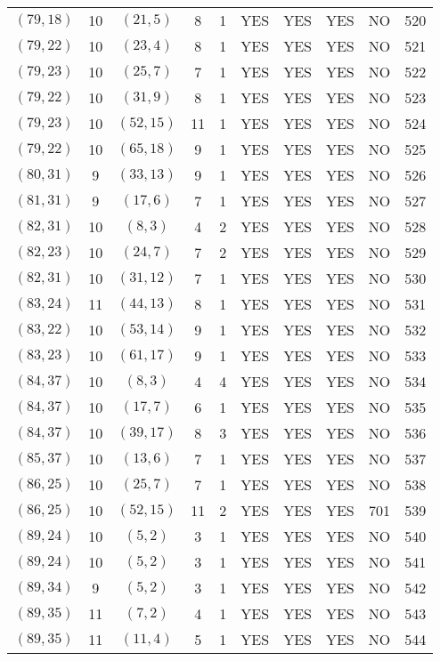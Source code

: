 \begin{longtable}{|c|c|c|c|c|c|c|c|c|c|}
$(79, 18)$ & 10 & $(21, 5)$ & 8 & 1 & YES & YES & YES & NO & 520\\
$(79, 22)$ & 10 & $(23, 4)$ & 8 & 1 & YES & YES & YES & NO & 521\\
$(79, 23)$ & 10 & $(25, 7)$ & 7 & 1 & YES & YES & YES & NO & 522\\
$(79, 22)$ & 10 & $(31, 9)$ & 8 & 1 & YES & YES & YES & NO & 523\\
$(79, 23)$ & 10 & $(52, 15)$ & 11 & 1 & YES & YES & YES & NO & 524\\
$(79, 22)$ & 10 & $(65, 18)$ & 9 & 1 & YES & YES & YES & NO & 525\\
$(80, 31)$ & 9 & $(33, 13)$ & 9 & 1 & YES & YES & YES & NO & 526\\
$(81, 31)$ & 9 & $(17, 6)$ & 7 & 1 & YES & YES & YES & NO & 527\\
$(82, 31)$ & 10 & $(8, 3)$ & 4 & 2 & YES & YES & YES & NO & 528\\
$(82, 23)$ & 10 & $(24, 7)$ & 7 & 2 & YES & YES & YES & NO & 529\\
$(82, 31)$ & 10 & $(31, 12)$ & 7 & 1 & YES & YES & YES & NO & 530\\
$(83, 24)$ & 11 & $(44, 13)$ & 8 & 1 & YES & YES & YES & NO & 531\\
$(83, 22)$ & 10 & $(53, 14)$ & 9 & 1 & YES & YES & YES & NO & 532\\
$(83, 23)$ & 10 & $(61, 17)$ & 9 & 1 & YES & YES & YES & NO & 533\\
$(84, 37)$ & 10 & $(8, 3)$ & 4 & 4 & YES & YES & YES & NO & 534\\
$(84, 37)$ & 10 & $(17, 7)$ & 6 & 1 & YES & YES & YES & NO & 535\\
$(84, 37)$ & 10 & $(39, 17)$ & 8 & 3 & YES & YES & YES & NO & 536\\
$(85, 37)$ & 10 & $(13, 6)$ & 7 & 1 & YES & YES & YES & NO & 537\\
$(86, 25)$ & 10 & $(25, 7)$ & 7 & 1 & YES & YES & YES & NO & 538\\
$(86, 25)$ & 10 & $(52, 15)$ & 11 & 2 & YES & YES & YES & 701 & 539\\
$(89, 24)$ & 10 & $(5, 2)$ & 3 & 1 & YES & YES & YES & NO & 540\\
$(89, 24)$ & 10 & $(5, 2)$ & 3 & 1 & YES & YES & YES & NO & 541\\
$(89, 34)$ & 9 & $(5, 2)$ & 3 & 1 & YES & YES & YES & NO & 542\\
$(89, 35)$ & 11 & $(7, 2)$ & 4 & 1 & YES & YES & YES & NO & 543\\
$(89, 35)$ & 11 & $(11, 4)$ & 5 & 1 & YES & YES & YES & NO & 544\\

\end{longtable}
